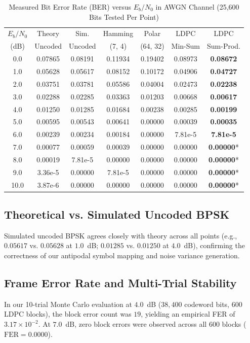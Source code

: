 \documentclass[conference]{IEEEtran}
\begin{document}
\begin{table}[htbp]
\caption{Measured Bit Error Rate (BER) versus $E_b/N_0$ in AWGN Channel (25,600 Bits Tested Per Point)}
\label{tab:ber_results}
\centering
\scriptsize
\begin{tabular}{ccccccc}
\toprule
$E_b/N_0$ & Theory & Sim. & Hamming & Polar & LDPC & LDPC \\
(dB) & Uncoded & Uncoded & (7, 4) & (64, 32) & Min-Sum & Sum-Prod. \\
\midrule
0.0 & 0.07865 & 0.08191 & 0.11934 & 0.19402 & 0.08973 & \textbf{0.08672} \\
1.0 & 0.05628 & 0.05617 & 0.08152 & 0.10172 & 0.04906 & \textbf{0.04727} \\
2.0 & 0.03751 & 0.03781 & 0.05586 & 0.04004 & 0.02473 & \textbf{0.02238} \\
3.0 & 0.02288 & 0.02285 & 0.03363 & 0.01203 & 0.00668 & \textbf{0.00617} \\
4.0 & 0.01250 & 0.01285 & 0.01684 & 0.00238 & 0.00285 & \textbf{0.00199} \\
5.0 & 0.00595 & 0.00543 & 0.00641 & 0.00000 & 0.00039 & \textbf{0.00035} \\
6.0 & 0.00239 & 0.00234 & 0.00184 & 0.00000 & 7.81e-5 & \textbf{7.81e-5} \\
7.0 & 0.00077 & 0.00059 & 0.00039 & 0.00000 & 0.00000 & \textbf{0.00000}* \\
8.0 & 0.00019 & 7.81e-5 & 0.00000 & 0.00000 & 0.00000 & \textbf{0.00000}* \\
9.0 & 3.36e-5 & 0.00000 & 7.81e-5 & 0.00000 & 0.00000 & \textbf{0.00000}* \\
10.0 & 3.87e-6 & 0.00000 & 0.00000 & 0.00000 & 0.00000 & \textbf{0.00000}* \\
\bottomrule
\end{tabular}
\end{table}

\subsection{Theoretical vs. Simulated Uncoded BPSK}
Simulated uncoded BPSK agrees closely with theory across all points (e.g., $0.05617$ vs. $0.05628$ at $1.0$~dB; $0.01285$ vs. $0.01250$ at $4.0$~dB), confirming the correctness of our antipodal symbol mapping and noise variance generation.

\subsection{Frame Error Rate and Multi-Trial Stability}
In our 10-trial Monte Carlo evaluation at $4.0$~dB ($38,400$ codeword bits, $600$ LDPC blocks), the block error count was $19$, yielding an empirical FER of $3.17 \times 10^{-2}$. At $7.0$~dB, zero block errors were observed across all $600$ blocks ($\text{FER} = 0.0000$).
\end{document}
